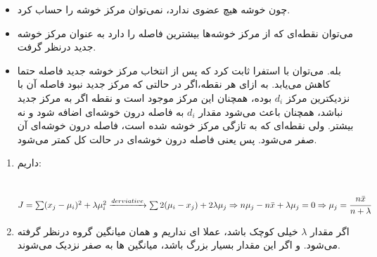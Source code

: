 \documentclass[a4paper,14pt]{extarticle}
\begin{document}
\begin{itemize}
	\item 
	چون خوشه هیچ عضوی ندارد، نمی‌توان مرکز خوشه را حساب کرد. 
	\item 
	می‌توان نقطه‌ای که از مرکز خوشه‌ها بیشترین فاصله را دارد به عنوان مرکز خوشه جدید درنظر گرفت. 
	\item 
	بله. می‌توان با استفرا ثابت کرد که پس از انتخاب مرکز خوشه جدید فاصله حتما کاهش می‌یابد. به ازای هر نقطه،‌اگر در حالتی که مرکز جدید نبود فاصله آن با نزدیکترین مرکز 
	$d_i$ 
	بوده، همچنان این مرکز موجود است و نقطه اگر به مرکز جدید نباشد، همچنان باعث می‌شود مقدار $d_i$  به فاصله درون خوشه‌ای اضافه شود و نه بیشتر. ولی نقطه‌ای که به تازگی مرکز خوشه شده است، فاصله درون خوشه‌ای آن صفر می‌شود. پس یعنی فاصله درون خوشه‌ای در حالت کل کمتر می‌شود.
\end{itemize}
\newpage
{}
\begin{enumerate}
	\item 
	داریم:
	\begin{latin}
		~\\
		$
		J = \sum (x_j - \mu_i)^2 + \lambda \mu_i^2 \xrightarrow{derviative} \sum 2( \mu_i - x_j) + 2 \lambda \mu_j  \Rightarrow n \mu_j - n \bar{x} + \lambda \mu_j = 0
		\Rightarrow \mu_j = \cfrac{n\bar{x}}{n + \lambda}
		$
	\end{latin}
	\item 
	اگر مقدار 
	$\lambda$
	خیلی کوچک باشد، عملا 
	ای نداریم و همان میانگین گروه درنظر گرفته می‌شود. و اگر این مقدار بسیار بزرگ باشد، میانگین ها به صفر نزدیک می‌شوند.
	
\end{enumerate}
\end{document}
